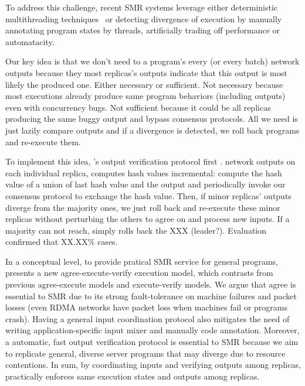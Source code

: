 To address this challenge, recent SMR systems leverage either deterministic 
multithreading techniques~\cite{rex:eurosys14,crane:sosp15} or detecting 
divergence of execution by manually annotating program states by threads, 
artificially trading off performance or automatacity.


Our key idea is that we don't need to a program's every (or every batch) 
network outputs because they most replicas's outputs indicate that this output 
is most likely the produced one. Either necessary or sufficient. Not necessary 
because most executions already produce same program behaviors (including 
outputs) even with concurrency bugs. Not sufficient because it could be all 
replicas producing the same buggy output and bypass consensus protocols. All we 
need is just lazily compare outputs and if a divergence is detected, we roll 
back programs and re-execute them.

To implement this idea, \xxx's output verification protocol first . network 
outputs on each individual replica, computes  hash values incremental:
compute the hash value of a union of last hash value and the output  and 
periodically invoke our \paxos consensus protocol to exchange the hash value. 
Then, if minor replicas' outputs diverge from the majority ones, we just roll 
back and re-execute these minor replicas without perturbing the others to agree 
on and process new inputs. If a majority can not reach, \xxx simply rolls back 
the XXX (leader?). Evaluation confirmed that XX.XX\% cases.


In a conceptual level, to provide pratical SMR service for general programs, 
\xxx presents a new agree-execute-verify execution model, which contrasts from 
previous agree-execute models and execute-verify models. We argue that agree is 
essential to SMR due to its strong fault-tolerance on machine failures and 
packet losses (even RDMA networks have packet loss when machines fail or 
programs crash). Having a general input coordination protocol also mitigates 
the need of writing application-specific input mixer and manually code 
annotation. Moreover, a automatic, fast output verification protocol is 
essential to SMR because we aim to replicate general, diverse server programs 
that may diverge due to resource contentions. In sum, by coordinating inputs 
and verifying outputs among replicas, \xxx practically enforces same execution 
states and outputs among replicas.

